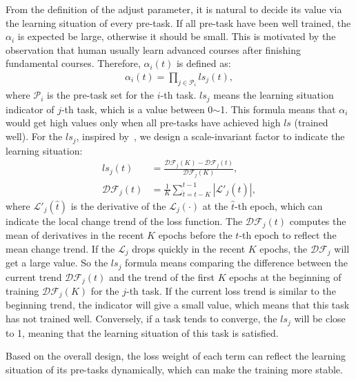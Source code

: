 \documentclass[10pt,twocolumn,letterpaper]{article}
\begin{document}
From the definition of the adjust parameter, it is natural to decide its value via the learning situation of every pre-task. If all pre-task have been well trained, the ${\alpha_i}$ is expected be large, otherwise it should be small. This is motivated by the observation that human usually learn advanced courses after finishing fundamental courses. Therefore, ${\alpha_i}(t)$ is defined as:
\begin{equation}
\begin{aligned}
     {\alpha_i}(t) = \prod_{j\in{\mathcal{P}_i}}ls_j(t),
\end{aligned}
\end{equation}
where $\mathcal{P}_i$ is the pre-task set for the $i$-th task. $ls_j$ means the learning situation indicator of $j$-th task, which is a value between 0$\sim$1. This formula means that $\alpha_i$ would get high values only when all pre-tasks have achieved high $ls$ (trained well). For the $ls_j$, inspired by~\cite{chen2018gradnorm,zhang2014facial}, we design a scale-invariant factor to indicate the learning situation:
\begin{equation}
\begin{aligned}
     {ls_j}(t) &= \frac{\mathcal{DF}_j(K)-\mathcal{DF}_j(t)}{\mathcal{DF}_j(K)},\\
     \mathcal{DF}_j(t) &= \frac{1}{K}\mathop{\sum}\limits_{\hat{t}=t-K}^{t-1}|\mathcal{L}'_j\left( \hat{t}\right)|,
\end{aligned}
\end{equation}
where $\mathcal{L}'_j(\hat{t})$ is the derivative of the $\mathcal{L}_j(\cdot)$ at the $\hat{t}$-th epoch, which can indicate the local change trend of the loss function. The $\mathcal{DF}_j(t)$ computes the mean of derivatives in the recent $K$ epochs before the $t$-th epoch to reflect the mean change trend. If the $\mathcal{L}_j$ drops quickly in the recent $K$ epochs, the $\mathcal{DF}_j$ will get a large value. So the ${ls_j}$ formula means comparing the difference between the current trend $\mathcal{DF}_j(t)$ and the trend of the first $K$ epochs at the beginning of training $\mathcal{DF}_j(K)$ for the $j$-th task. If the current loss trend is similar to the beginning trend, the indicator will give a small value, which means that this task has not trained well. Conversely, if a task tends to converge, the ${ls_j}$ will be close to 1, meaning that the learning situation of this task is satisfied.



Based on the overall design, the loss weight of each term can reflect the learning situation of its pre-tasks dynamically, which can make the training more stable.
\end{document}
